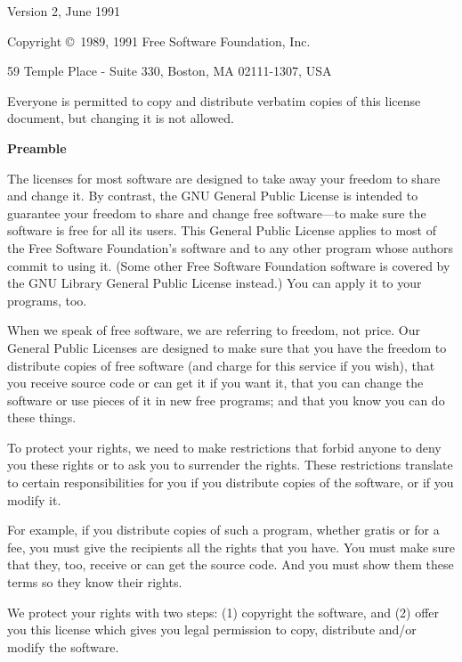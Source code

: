 \documentclass[12pt,openany,a4paper]{book}
\begin{document}
{ \scriptsize
\begin{center}
{\parindent 0in

Version 2, June 1991

Copyright \copyright\ 1989, 1991 Free Software Foundation, Inc.

\bigskip

59 Temple Place - Suite 330, Boston, MA  02111-1307, USA

\bigskip

Everyone is permitted to copy and distribute verbatim copies
of this license document, but changing it is not allowed.
}
\end{center}

\begin{center}
{\bf\large Preamble}
\end{center}


The licenses for most software are designed to take away your freedom to
share and change it.  By contrast, the GNU General Public License is
intended to guarantee your freedom to share and change free software---to
make sure the software is free for all its users.  This General Public
License applies to most of the Free Software Foundation's software and to
any other program whose authors commit to using it.  (Some other Free
Software Foundation software is covered by the GNU Library General Public
License instead.)  You can apply it to your programs, too.

When we speak of free software, we are referring to freedom, not price.
Our General Public Licenses are designed to make sure that you have the
freedom to distribute copies of free software (and charge for this service
if you wish), that you receive source code or can get it if you want it,
that you can change the software or use pieces of it in new free programs;
and that you know you can do these things.

To protect your rights, we need to make restrictions that forbid anyone to
deny you these rights or to ask you to surrender the rights.  These
restrictions translate to certain responsibilities for you if you
distribute copies of the software, or if you modify it.

For example, if you distribute copies of such a program, whether gratis or
for a fee, you must give the recipients all the rights that you have.  You
must make sure that they, too, receive or can get the source code.  And
you must show them these terms so they know their rights.

We protect your rights with two steps: (1) copyright the software, and (2)
offer you this license which gives you legal permission to copy,
distribute and/or modify the software.

}
\end{document}
